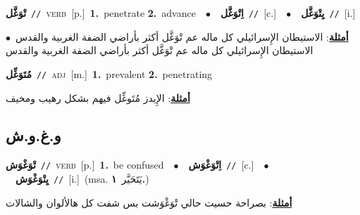 \documentclass[10pt,a4paper,twoside]{article} %
\begin{document}
\begin{multicols}{2}
{\setlength\topsep{0pt}\textbf{\foreignlanguage{arabic}{تْوَغَّل}}\ {\color{gray}\texttt{//}\color{black}}\ \textsc{verb}\ [p.]\ \textbf{1.}~penetrate  \textbf{2.}~advance\ \ $\bullet$\ \ \setlength\topsep{0pt}\textbf{\foreignlanguage{arabic}{اِتْوَغَّل}}\ {\color{gray}\texttt{//}\color{black}}\ [c.]\ \ $\bullet$\ \ \setlength\topsep{0pt}\textbf{\foreignlanguage{arabic}{يِتْوَغَّل}}\ {\color{gray}\texttt{//}\color{black}}\ [i.]\  \begin{flushright}\color{gray}\foreignlanguage{arabic}{\textbf{\underline{\foreignlanguage{arabic}{أمثلة}}}: الاستيطان الإِسرائيلي كل ماله عم تْوَغَّل أكثر بأراضي الضفة الغربية والقدس\ $\bullet$\ \  الاستيطان الإِسرائيلي كل ماله عم تْوَغَّل أكثر بأراضي الضفة الغربية والقدس}\end{flushright}\color{black}} \vspace{2mm}

{\setlength\topsep{0pt}\textbf{\foreignlanguage{arabic}{مُتَوَغِّل}}\ {\color{gray}\texttt{//}\color{black}}\ \textsc{adj}\ [m.]\ \textbf{1.}~prevalent  \textbf{2.}~penetrating\  \begin{flushright}\color{gray}\foreignlanguage{arabic}{\textbf{\underline{\foreignlanguage{arabic}{أمثلة}}}: الإِيدز مُتَوغِّل فيهم بشكل رهيب ومخيف}\end{flushright}\color{black}} \vspace{2mm}

\vspace{-3mm}
\subsection*{\color{blue}\foreignlanguage{arabic}{و.غ.و.ش}\color{blue}{}} 

{\setlength\topsep{0pt}\textbf{\foreignlanguage{arabic}{تْوَغْوَش}}\ {\color{gray}\texttt{//}\color{black}}\ \textsc{verb}\ [p.]\ \textbf{1.}~be confused\ \ $\bullet$\ \ \setlength\topsep{0pt}\textbf{\foreignlanguage{arabic}{اِتْوَغْوَش}}\ {\color{gray}\texttt{//}\color{black}}\ [c.]\ \ $\bullet$\ \ \setlength\topsep{0pt}\textbf{\foreignlanguage{arabic}{يِتْوَغْوَش}}\ {\color{gray}\texttt{//}\color{black}}\ [i.]\ \color{gray}(msa. \foreignlanguage{arabic}{يَتَحَيَّر}~\foreignlanguage{arabic}{\textbf{١.}})\color{black}\  \begin{flushright}\color{gray}\foreignlanguage{arabic}{\textbf{\underline{\foreignlanguage{arabic}{أمثلة}}}: بصراحة حسيت حالي تْوَغْوَشت بس شفت كل هالألوان والشالات}\end{flushright}\color{black}} \vspace{2mm}


\end{multicols}
\end{document}
